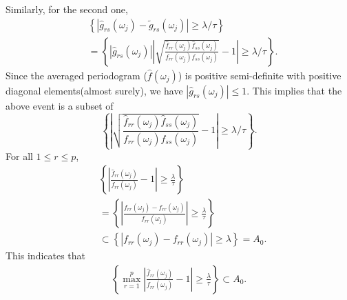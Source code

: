 Similarly, for the second one,  
\begin{equation*}
\begin{aligned}
&\left\{|\hat{g}_{rs}(\omega_j)-\tilde{g}_{rs}(\omega_j)| \ge \lambda/\tau \right\}\\
&= \left\{\left|\hat{g}_{rs}(\omega_j) \right| \left|\sqrt{\frac{\hat{f}_{rr}(\omega_j)\hat{f}_{ss}(\omega_j)}{f_{rr}(\omega_j)f_{ss}(\omega_j)}}-1\right| \ge \lambda/\tau\right\}.
\end{aligned}
\end{equation*}
Since the averaged periodogram  ($\hat{f}(\omega_j)$) is positive semi-definite with positive diagonal elements(almost surely), we have $|\hat{g}_{rs}(\omega_j)|\le 1$. This implies that the above event is a subset of 
\begin{equation}
\left\{\left|\sqrt{\frac{\hat{f}_{rr}(\omega_j)\hat{f}_{ss}(\omega_j)}{f_{rr}(\omega_j)f_{ss}(\omega_j)}}-1\right| \ge \lambda/\tau \right\}. \nonumber
\end{equation}
For all $1\le r\le p$, 
\begin{equation}
\label{eq:single-ratio-bound}
\begin{aligned}
&\left\{\left|\frac{\hat{f}_{rr}(\omega_j)}{f_{rr}(\omega_j)}-1\right|\ge \frac{\lambda}{\tau}\right\}  \\
& = \left\{\left|\frac{f_{rr}(\omega_j) - f_{rr}(\omega_j)}{f_{rr}(\omega_j)}\right|\ge \frac{\lambda}{\tau}\right\}\\
& \subset \left\{\left|f_{rr}(\omega_j) - f_{rr}(\omega_j)\right|\ge \lambda\right\} = A_0. \nonumber 
\end{aligned}
\end{equation}
This indicates that 
\begin{equation}
\begin{aligned}
\left\{\max_{r=1}^p\left|\frac{\hat{f}_{rr}(\omega_j)}{f_{rr}(\omega_j)}-1\right|\ge \frac{\lambda}{\tau}\right\} \subset A_0. \nonumber 
\end{aligned}
\end{equation}


